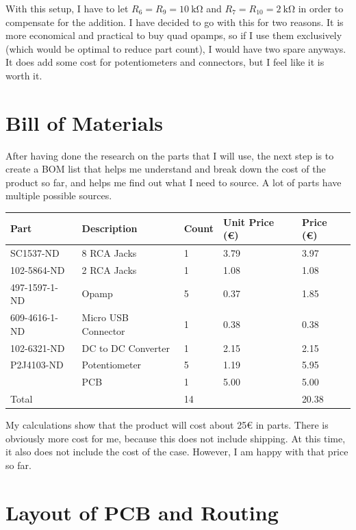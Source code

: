 \documentclass[a4paper]{article}
\begin{document}
With this setup, I have to let $R_6 = R_9 = \SI{10}{\kilo\ohm}$ and $R_7 = R_{10} = \SI{2}{\kilo\ohm}$ in order to compensate for the addition. I have decided to go with this for two reasons. It is more economical and practical to buy quad opamps, so if I use them exclusively (which would be optimal to reduce part count), I would have two spare anyways. It does add some cost for potentiometers and connectors, but I feel like it is worth it.

\section{Bill of Materials}

After having done the research on the parts that I will use, the next step is to create a BOM list that helps me understand and break down the cost of the product so far, and helps me find out what I need to source. A lot of parts have multiple possible sources.

\begin{center}
\begin{tabular}{@{}lllll@{}}
\toprule
Part & Description & Count & Unit Price (€) & Price (€)\\
\midrule
SC1537-ND & 8 RCA Jacks & 1 & 3.79 & 3.97\\
102-5864-ND & 2 RCA Jacks & 1 & 1.08 & 1.08\\
497-1597-1-ND & Opamp & 5 & 0.37 & 1.85\\
609-4616-1-ND & Micro USB Connector & 1 & 0.38 & 0.38\\
102-6321-ND & DC to DC Converter & 1 & 2.15 & 2.15\\
P2J4103-ND & Potentiometer & 5 & 1.19 & 5.95\\
& PCB & 1 & 5.00 & 5.00\\
\midrule
Total & & 14 && 20.38\\
\bottomrule
\end{tabular}
\end{center}

My calculations show that the product will cost about 25€ in parts. There is obviously more cost for me, because this does not include shipping. At this time, it also does not include the cost of the case. However, I am happy with that price so far. 

\section{Layout of PCB and Routing}
\end{document}
